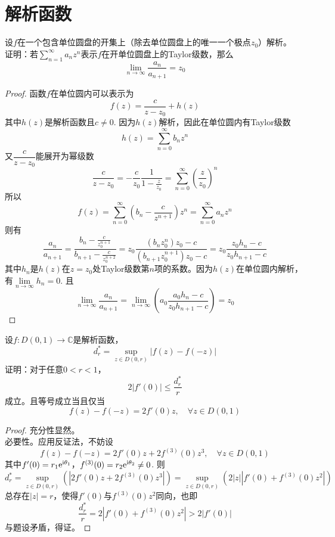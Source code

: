 \section{解析函数}

\begin{proposition}
    
    设$f$在一个包含单位圆盘的开集上（除去单位圆盘上的唯一一个极点$z_0$）解析。\\
    证明：若$\sum\limits_{n=1}^{\infty}{a_nz^n}$表示$f$在开单位圆盘上的\textup{Taylor}级数，那么
    $$\lim\limits_{n\to\infty}{\dfrac{a_n}{a_{n+1}}} = z_0$$

\end{proposition}

\begin{proof}
    
    函数$f$在单位圆内可以表示为
    $$f(z) = \dfrac{c}{z - z_0} + h(z)$$
    其中$h(z)$是解析函数且$c \neq 0$. 因为$h(z)$解析，因此在单位圆内有\textup{Taylor}级数
    $$h(z) = \sum\limits_{n = 0}^{\infty}{b_n z^n}$$
    又$\dfrac{c}{z - z_0}$能展开为幂级数
    $$\dfrac{c}{z - z_0} = -\dfrac{c}{z_0}\dfrac{1}{1 - \frac{z}{z_0}} = \sum\limits_{n = 0}^{\infty}{\left(\dfrac{z}{z_0}\right)^n}$$
    所以
    $$f(z) = \sum\limits_{n = 0}^{\infty}{\left(b_n - \dfrac{c}{z^{n + 1}}\right)z^n} = \sum\limits_{n = 0}^{\infty}{a_n z^n}$$
    则有
    $$\dfrac{a_n}{a_{n+1}} = 
    \dfrac{b_n - \frac{c}{z_0^{n+1}}} {b_{n+1} - \frac{c}{z_0^{n+2}}} = 
    z_0 \dfrac{(b_n z_0^n) z_0 - c} {(b_{n+1}z_0^{n+1}) z_0 - c} =
    z_0 \dfrac{z_0 h_n - c}{z_0 h_{n+1} - c}$$
    其中$h_n$是$h(z)$在$z = z_0$处\textup{Taylor}级数第$n$项的系数。因为$h(z)$在单位圆内解析，有$\lim\limits_{n \to \infty}{h_n} = 0$. 且
    $$\lim\limits_{n \to \infty}{\dfrac{a_n}{a_{n + 1}}} = \lim\limits_{n \to \infty}{\left(a_0 \dfrac{a_0 h_n - c}{z_0h_{n + 1} - c}\right)} = z_0$$

\end{proof}

\begin{proposition}

    设$f : D(0,1) \to \mathbb{C}$是解析函数，
    $$d_r^{*} = \sup\limits_{z \in D(0,r)}{|f(z) - f(-z)|}$$
    证明：对于任意$0 < r < 1$，
    $$2|f'(0)| \leq \dfrac{d_r^{*}}{r}$$
    成立。且等号成立当且仅当
    $$f(z) - f(-z) = 2f'(0)z, \quad \forall z \in D(0,1)$$

\end{proposition}

\begin{proof}

    充分性显然。\\
    必要性。应用反证法，不妨设
    $$f(z) - f(-z) = 2f'(0)z + 2f^{(3)}(0)z^3, \quad \forall z \in D(0,1)$$
    其中$f'(0) = r_1\mathrm{e}^{\mathrm{i} \theta_1}$，$f^{(3)}(0) = r_2\mathrm{e}^{\mathrm{i} \theta_2} \neq 0$. 则
    $$d_r^{*} = \sup\limits_{z \in D(0,r)}{(|2f'(0)z + 2f^{(3)}(0)z^3|)} = \sup\limits_{z \in D(0,r)}{(2|z||f'(0) + f^{(3)}(0)z^2|)}$$
    总存在$|z| = r$，使得$f'(0)$与$f^{(3)}(0)z^2$同向，也即
    $$\dfrac{d_r^{*}}{r} = 2|f'(0) + f^{(3)}(0)z^2| > 2|f'(0)|$$
    与题设矛盾，得证。

\end{proof}

